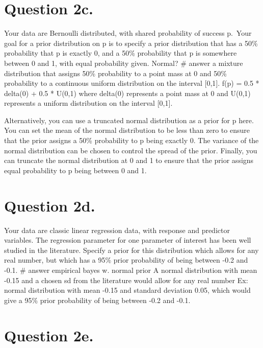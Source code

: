 \documentclass[
]{article}
\begin{document}
\hypertarget{question-2c.}{%
\section{Question 2c.}\label{question-2c.}}

Your data are Bernoulli distributed, with shared probability of success
p.~Your goal for a prior distribution on p is to specify a prior
distribution that has a 50\% probability that p is exactly 0, and a 50\%
probability that p is somewhere between 0 and 1, with equal probability
given. Normal? \# answer a mixture distribution that assigns 50\%
probability to a point mass at 0 and 50\% probability to a continuous
uniform distribution on the interval {[}0,1{]}. f(p) = 0.5 * delta(0) +
0.5 * U(0,1) where delta(0) represents a point mass at 0 and U(0,1)
represents a uniform distribution on the interval {[}0,1{]}.

Alternatively, you can use a truncated normal distribution as a prior
for p here. You can set the mean of the normal distribution to be less
than zero to ensure that the prior assigns a 50\% probability to p being
exactly 0. The variance of the normal distribution can be chosen to
control the spread of the prior. Finally, you can truncate the normal
distribution at 0 and 1 to ensure that the prior assigns equal
probability to p being between 0 and 1.

\hypertarget{question-2d.}{%
\section{Question 2d.}\label{question-2d.}}

Your data are classic linear regression data, with response and
predictor variables. The regression parameter \beta for one parameter of
interest has been well studied in the literature. Specify a prior for
this distribution which allows for any real number, but which has a 95\%
prior probability of being between -0.2 and -0.1. \# answer empirical
bayes w. normal prior A normal distribution with mean -0.15 and a chosen
sd from the literature would allow for any real number Ex: normal
distribution with mean -0.15 and standard deviation 0.05, which would
give a 95\% prior probability of being between -0.2 and -0.1.

\hypertarget{question-2e.}{%
\section{Question 2e.}\label{question-2e.}}
\end{document}
